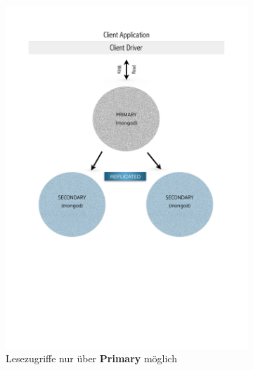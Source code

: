 \begin{figure}[H]
   \begin{subfigure}[t]{0.49\textwidth}\vspace{0pt}
   \centering
    	\includegraphics[trim = 0mm 90mm 0mm 20mm, clip, width=1.0\textwidth]{resources/replicaSet/replicaSetStrongConsistency}
	\caption[Lesezugriffe nur über Primary möglich]{Lesezugriffe nur über \textbf{Primary} möglich}
	\label{img:slaveNotOk}
   \end{subfigure}\hfill%
   \begin{subfigure}[t]{0.49\textwidth}\vspace{0pt}
   \centering

\end{subfigure}
\end{figure}
